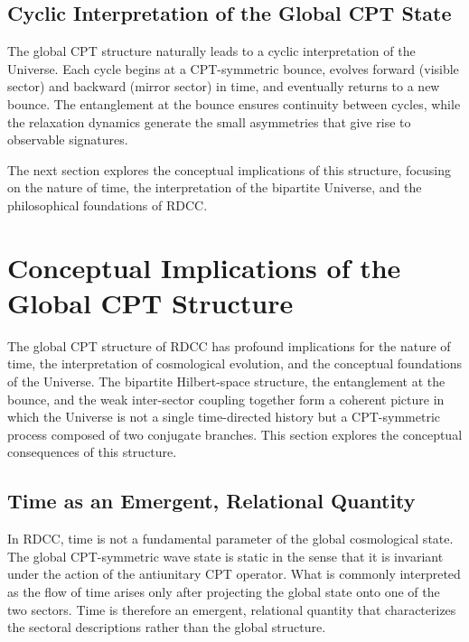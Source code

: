 \documentclass[11pt,a4paper]{article}
\begin{document}
\subsection{Cyclic Interpretation of the Global CPT State}

The global CPT structure naturally leads to a cyclic interpretation of the Universe. Each cycle begins at a CPT-symmetric bounce, evolves forward (visible sector) and backward (mirror sector) in time, and eventually returns to a new bounce. The entanglement at the bounce ensures continuity between cycles, while the relaxation dynamics generate the small asymmetries that give rise to observable signatures.

The next section explores the conceptual implications of this structure, focusing on the nature of time, the interpretation of the bipartite Universe, and the philosophical foundations of RDCC.


\section{Conceptual Implications of the Global CPT Structure}

The global CPT structure of RDCC has profound implications for the nature of time, the interpretation of cosmological evolution, and the conceptual foundations of the Universe. The bipartite Hilbert-space structure, the entanglement at the bounce, and the weak inter-sector coupling together form a coherent picture in which the Universe is not a single time-directed history but a CPT-symmetric process composed of two conjugate branches. This section explores the conceptual consequences of this structure.

\subsection{Time as an Emergent, Relational Quantity}

In RDCC, time is not a fundamental parameter of the global cosmological state. The global
CPT-symmetric wave state is static in the sense that it is invariant under the action of the
antiunitary CPT operator. What is commonly interpreted as the flow of time arises only after
projecting the global state onto one of the two sectors. Time is therefore an emergent, relational
quantity that characterizes the sectoral descriptions rather than the global structure.
\end{document}
